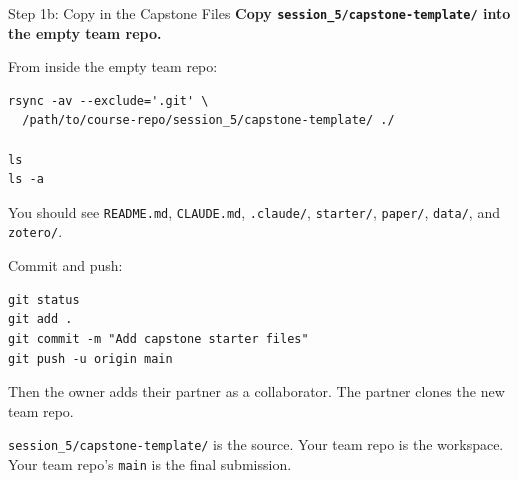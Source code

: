\documentclass[aspectratio=169, 11pt]{beamer}
\begin{document}
\begin{frame}[fragile,shrink=8]{Step 1b: Copy in the Capstone Files}
  \textbf{Copy \texttt{session\_5/capstone-template/} into the empty team repo.}

  \vspace{0.4em}
  From inside the empty team repo:
  \begin{lstlisting}[basicstyle=\ttfamily\scriptsize]
rsync -av --exclude='.git' \
  /path/to/course-repo/session_5/capstone-template/ ./

ls
ls -a
  \end{lstlisting}

  \vspace{0.3em}
  You should see \texttt{README.md}, \texttt{CLAUDE.md}, \texttt{.claude/}, \texttt{starter/}, \texttt{paper/}, \texttt{data/}, and \texttt{zotero/}.

  \vspace{0.5em}
  Commit and push:
  \begin{lstlisting}[basicstyle=\ttfamily\scriptsize]
git status
git add .
git commit -m "Add capstone starter files"
git push -u origin main
  \end{lstlisting}

  \vspace{0.3em}
  Then the owner adds their partner as a collaborator. The partner clones the new team repo.

  \vspace{0.3em}
  \alert{\small \texttt{session\_5/capstone-template/} is the source. Your team repo is the workspace. Your team repo's \texttt{main} is the final submission.}
\end{frame}
\end{document}
